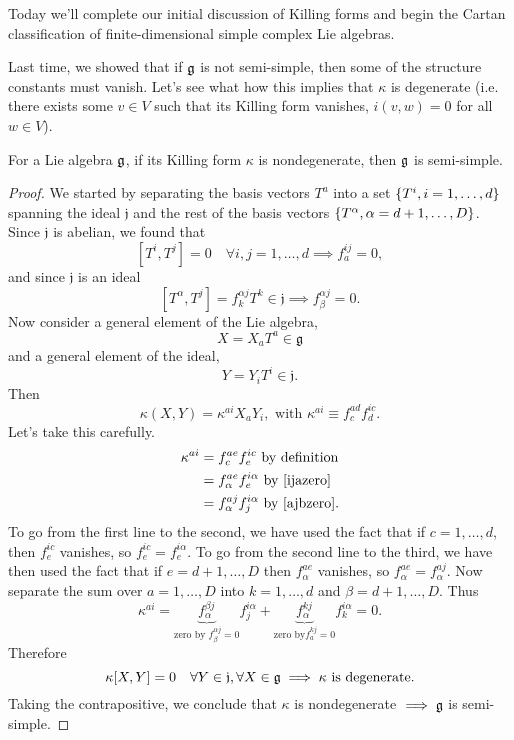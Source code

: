 Today we'll complete our initial discussion of Killing forms and begin the Cartan classification of finite-dimensional simple complex Lie algebras.

Last time, we showed that if $\mathfrak{g}$ is not semi-simple, then some of the structure constants must vanish. Let's see what how this implies that $\kappa$ is degenerate (i.e. there exists some $v\in V$ such that its Killing form vanishes, $i(v,w)=0$ for all $w\in V$).
\begin{thm}
For a Lie algebra $\mathfrak{g}$, if its Killing form $\kappa$ is nondegenerate, then $\mathfrak{g}$ is semi-simple.
\end{thm}
\begin{proof}
We started by separating the basis vectors $T^a$ into a set $\{T^i,i=1,\ldots,d\}$ spanning the ideal $\mathfrak{j}$ and the rest of the basis vectors $\{T^\alpha, \alpha=d+1,\ldots, D\}$. Since $\mathfrak{j}$ is abelian, we found that
\begin{equation}\label{ijazero}
[T^i, T^j]=0\quad \forall i,j=1,\ldots,d \implies f^{ij}_a=0,
\end{equation}
and since $\mathfrak{j}$ is an ideal
\begin{equation}\label{ajbzero}
[T^\alpha, T^j]=f^{\alpha j}_k T^k\in \mathfrak{j} \implies f^{\alpha j}_\beta=0.
\end{equation}
Now consider a general element of the Lie algebra, $$X=X_a T^a \in \mathfrak{g}$$ and a general element of the ideal,
$$Y=Y_i T^i \in \mathfrak{j}.$$
Then
$$\kappa(X,Y)=\kappa^{ai}X_a Y_i,\text{ with }
\kappa^{ai}\equiv f^{ad}_c f^{ic}_d.$$
Let's take this carefully.
\begin{align*}
\kappa^{ai}&=f^{ae}_c f^{ic}_e\text{ by definition}\\
&=f^{ae}_\alpha f^{i\alpha}_e\text{ by }\ref{ijazero}\\
&=f^{aj}_\alpha f^{i\alpha}_j\text{ by }\ref{ajbzero}.
\end{align*}
To go from the first line to the second, we have used the fact that if $c=1,\ldots,d$, then $f^{ic}_e$ vanishes, so $f^{ic}_e=f^{i\alpha}_e$. To go from the second line to the third, we have then used the fact that if $e=d+1,\ldots,D$ then $f^{ae}_{\alpha}$ vanishes, so $f^{ae}_\alpha=f^{aj}_\alpha.$
Now separate the sum over $a=1,\ldots,D$ into $k=1,\ldots,d$ and $\beta=d+1,\ldots,D$.
Thus
$$\kappa^{ai}=\underbrace{f^{\beta j}_\alpha}_{\text{zero by } f^{\alpha j}_\beta=0} f^{i\alpha}_j + \underbrace{f^{kj}_\alpha}_{\text{zero by}f^{kj}_a=0} f^{i\alpha}_k=0.$$
Therefore $$\kappa[X,Y]=0 \quad\forall Y\in \mathfrak{j},\forall X \in \mathfrak{g}\implies \kappa\text{ is degenerate.}$$ Taking the contrapositive, we conclude that $\kappa$ is nondegenerate $\implies \mathfrak{g}$ is semi-simple.
\end{proof}

